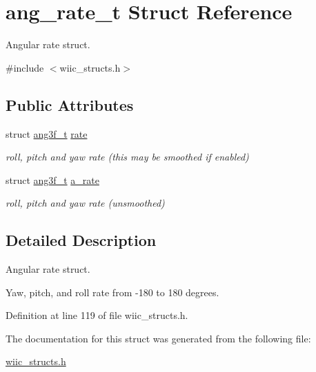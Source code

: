 \hypertarget{structang__rate__t}{\section{ang\-\_\-rate\-\_\-t \-Struct \-Reference}
\label{structang__rate__t}
}


\-Angular rate struct.  




{\ttfamily \#include $<$wiic\-\_\-structs.\-h$>$}

\subsection*{\-Public \-Attributes}
\begin{DoxyCompactItemize}
\item 
\hypertarget{structang__rate__t_aa1fa5093d421095a2eeae1ad07b341eb}{struct \hyperlink{structang3f__t}{ang3f\-\_\-t} \hyperlink{structang__rate__t_aa1fa5093d421095a2eeae1ad07b341eb}{rate}}\label{structang__rate__t_aa1fa5093d421095a2eeae1ad07b341eb}

\begin{DoxyCompactList}\small\item\em roll, pitch and yaw rate (this may be smoothed if enabled) \end{DoxyCompactList}\item 
\hypertarget{structang__rate__t_a255841f280d6b3e0bc07549ccabb9a4c}{struct \hyperlink{structang3f__t}{ang3f\-\_\-t} \hyperlink{structang__rate__t_a255841f280d6b3e0bc07549ccabb9a4c}{a\-\_\-rate}}\label{structang__rate__t_a255841f280d6b3e0bc07549ccabb9a4c}

\begin{DoxyCompactList}\small\item\em roll, pitch and yaw rate (unsmoothed) \end{DoxyCompactList}\end{DoxyCompactItemize}


\subsection{\-Detailed \-Description}
\-Angular rate struct. 

\-Yaw, pitch, and roll rate from -\/180 to 180 degrees. 

\-Definition at line 119 of file wiic\-\_\-structs.\-h.



\-The documentation for this struct was generated from the following file\-:\begin{DoxyCompactItemize}
\item 
\hyperlink{wiic__structs_8h}{wiic\-\_\-structs.\-h}\end{DoxyCompactItemize}
